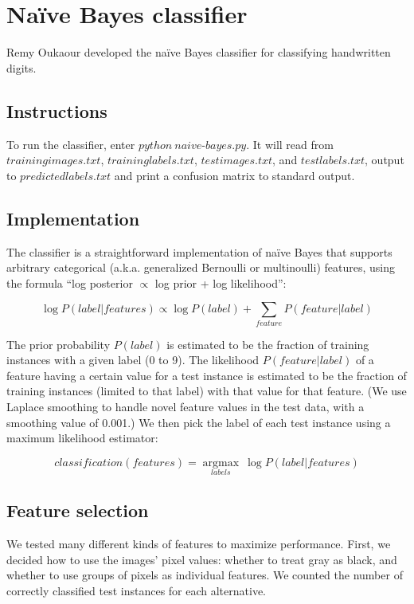 \documentclass[11pt]{article}
\begin{document}
\section{Na{\"i}ve Bayes classifier}

Remy Oukaour developed the na{\"i}ve Bayes classifier for classifying handwritten
digits.

\subsection{Instructions}

To run the classifier, enter $python\ naive\text{-}bayes.py$. It will read from
$trainingimages.txt$, $traininglabels.txt$, $testimages.txt$, and $testlabels.txt$,
output to $predictedlabels.txt$ and print a confusion matrix to standard output.

\subsection{Implementation}

The classifier is a straightforward implementation of na{\"i}ve Bayes that supports
arbitrary categorical (a.k.a. generalized Bernoulli or multinoulli) features, using
the formula ``log posterior $\propto$ log prior + log likelihood'':

$$\log P(label|features) \propto \log P(label) + \sum_{feature} P(feature|label)$$

The prior probability $P(label)$ is estimated to be the fraction of training instances
with a given label (0 to 9). The likelihood $P(feature|label)$ of a feature having a
certain value for a test instance is estimated to be the fraction of training instances
(limited to that label) with that value for that feature. (We use Laplace smoothing to
handle novel feature values in the test data, with a smoothing value of 0.001.) We then
pick the label of each test instance using a maximum likelihood estimator:

$$classification(features) = \underset{labels}{\operatorname{argmax}} \ \log P(label|features)$$

\subsection{Feature selection}

We tested many different kinds of features to maximize performance. First, we decided
how to use the images' pixel values: whether to treat gray as black, and whether to use
groups of pixels as individual features. We counted the number of correctly classified
test instances for each alternative.
\end{document}
